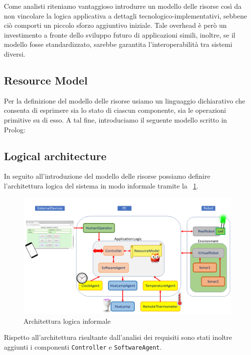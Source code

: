 \documentclass{../llncs}
\newcommand{\labelfig}[1]{\label{fig:#1}}
\newcommand{\xf}[1]{\figurename~\ref{fig:#1}}
\begin{document}
Come analisti riteniamo vantaggioso introdurre un modello delle risorse così da non vincolare la logica applicativa a dettagli tecnologico-implementativi, sebbene ciò comporti un piccolo sforzo aggiuntivo iniziale. Tale overhead è però un investimento a fronte dello sviluppo futuro di applicazioni simili, inoltre, se il modello fosse standardizzato, sarebbe garantita l'interoperabilità tra sistemi diversi.

\subsection{Resource Model}
Per la definizione del modello delle risorse usiamo un linguaggio dichiarativo che consenta di esprimere sia lo stato di ciascun componente, sia le operazioni primitive su di esso. A tal fine, introduciamo il seguente modello scritto in Prolog:\\



\subsection{Logical architecture}
In seguito all'introduzione del modello delle risorse possiamo definire l'architettura logica del sistema in modo informale tramite la \xf{informalLA}.

\begin{figure}[!htb]
\centering
\includegraphics[scale=0.4]{img/informalArchitecture2.png}
\caption{Architettura logica informale}\labelfig{informalLA}
\end{figure}

Rispetto all'architettura risultante dall'analisi dei requisiti sono stati inoltre aggiunti i componenti \texttt{Controller} e \texttt{SoftwareAgent}.
\end{document}
